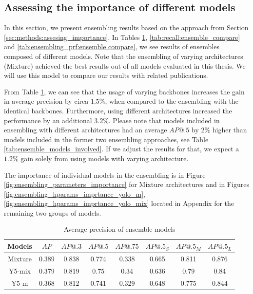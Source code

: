 \subsection{Assessing the importance of different models}
\label{sec:results:improtance_of_models}
In this section, we present ensembling results based on the approach from Section \ref{sec:methods:assesing_importance}. In Tables \ref{tab:precision:ensemble_compare}, \ref{tab:recall:ensemble_compare} and \ref{tab:ensembling_prf:ensemble compare}, we see results of ensembles composed of different models. Note that the ensembling of varying architectures (Mixture) achieved the best results out of all models evaluated in this thesis. We will use this model to compare our results with related publications.

From Table \ref{tab:precision:ensemble_compare}, we can see that the usage of varying backbones increases the gain in average precision by circa $1.5\%$, when compared to the ensembling with the identical backbones. Furthermore, using different architectures increased the performance by an additional $3.2\%$. Please note that models included in ensembling with different architectures had an average $AP@.5$ by $2\%$  higher than models included in the former two ensembling approaches, see Table \ref{tab:ensemble_models_involved}. If we adjust the results for that, we expect a $1.2\%$ gain solely from using models with varying architecture.


The importance of individual models in the ensembling is in Figure \ref{fig:ensembling_parameters_importance} for Mixture architectures and in Figures \ref{fig:ensembling_hparams_imprtance_yolo_m}, \ref{fig:ensembling_hparams_imprtance_yolo_mix} located in Appendix for the remaining two groups of models.


\begin{table}[h]
    \centering
    \begin{tabular}{|c|c|c|c|c|c|c|c|}
        \hline
        Models  & $AP$  & $AP@.3$ & $AP@.5$ & $AP@.75$ & $AP@.5_S$ & $AP@.5_M$ & $AP@.5_L$ \\ \hline
        Mixture & 0.389 & 0.838   & 0.774   & 0.338    & 0.665     & 0.811     & 0.876     \\ \hline
        Y5-mix  & 0.379 & 0.819   & 0.75    & 0.34     & 0.636     & 0.79      & 0.84      \\ \hline
        Y5-m    & 0.368 & 0.812   & 0.741   & 0.329    & 0.648     & 0.775     & 0.844     \\ \hline
    \end{tabular}
    \caption{Average precision of ensemble models}
    \label{tab:precision:ensemble_compare}
\end{table}


